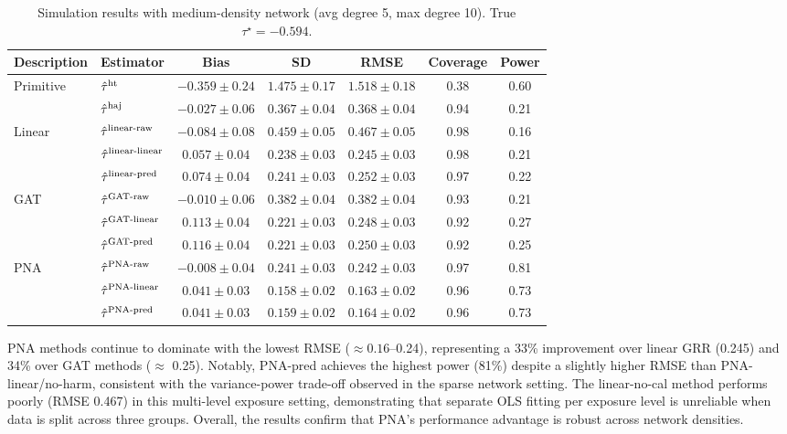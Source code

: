 \documentclass{article}
\theoremstyle{plain}
\theoremstyle{definition}
\theoremstyle{remark}
\newcommand{\hort}{\textup{ht}}
\newcommand{\haj}{\textup{haj}}
\begin{document}
\begin{table}[h]
    \centering
    \caption{Simulation results with medium-density network (avg degree 5, max degree 10). True $\tau^\star = -0.594$.}
    \small
    \begin{tabular}{ll|ccc|cc}
        \toprule
        Description & Estimator & Bias & SD & RMSE & Coverage & Power \\
        \midrule
        Primitive  & $\hat\tau^{\hort}$ & $-0.359 \pm 0.24$ & $1.475 \pm 0.17$ & $1.518 \pm 0.18$ & 0.38 & 0.60 \\
        & $\hat\tau^{\haj}$ & $-0.027 \pm 0.06$ & $0.367 \pm 0.04$ & $0.368 \pm 0.04$ & 0.94 & 0.21 \\
        \midrule
        Linear  
        & $\hat\tau^{\textup{linear-raw}}$ & $-0.084 \pm 0.08$ & $0.459 \pm 0.05$ & $0.467 \pm 0.05$ & 0.98 & 0.16 \\
        & $\hat\tau^{\textup{linear-linear}}$ & $0.057 \pm 0.04$ & $0.238 \pm 0.03$ & $0.245 \pm 0.03$ & 0.98 & 0.21 \\
        & $\hat\tau^{\textup{linear-pred}}$ & $0.074 \pm 0.04$ & $0.241 \pm 0.03$ & $0.252 \pm 0.03$ & 0.97 & 0.22 \\
        \midrule
        GAT
        & $\hat\tau^{\textup{GAT-raw}}$ & $-0.010 \pm 0.06$ & $0.382 \pm 0.04$ & $0.382 \pm 0.04$ & 0.93 & 0.21 \\
        & $\hat\tau^{\textup{GAT-linear}}$ & $0.113 \pm 0.04$ & $0.221 \pm 0.03$ & $0.248 \pm 0.03$ & 0.92 & 0.27 \\
        & $\hat\tau^{\textup{GAT-pred}}$ & $0.116 \pm 0.04$ & $0.221 \pm 0.03$ & $0.250 \pm 0.03$ & 0.92 & 0.25 \\
        \midrule
        PNA 
        & $\hat\tau^{\textup{PNA-raw}}$ & $\mathbf{-0.008 \pm 0.04}$ & $\mathbf{0.241 \pm 0.03}$ & $\mathbf{0.242 \pm 0.03}$ & 0.97 & 0.81 \\
        & $\hat\tau^{\textup{PNA-linear}}$ & $\mathbf{0.041 \pm 0.03}$ & $\mathbf{0.158 \pm 0.02}$ & $\mathbf{0.163 \pm 0.02}$ & 0.96 & 0.73 \\
        & $\hat\tau^{\textup{PNA-pred}}$ & $\mathbf{0.041 \pm 0.03}$ & $\mathbf{0.159 \pm 0.02}$ & $\mathbf{0.164 \pm 0.02}$ & 0.96 & 0.73 \\
        \bottomrule
    \end{tabular}
    \label{tab::simu_out2_results}
\end{table}

PNA methods continue to dominate with the lowest RMSE ($\approx 0.16$--0.24), representing a 33\% improvement over linear GRR (0.245) and 34\% over GAT methods ($\approx$ 0.25). Notably, PNA-pred achieves the highest power (81\%) despite a slightly higher RMSE than PNA-linear/no-harm, consistent with the variance-power trade-off observed in the sparse network setting. The linear-no-cal method performs poorly (RMSE 0.467) in this multi-level exposure setting, demonstrating that separate OLS fitting per exposure level is unreliable when data is split across three groups. Overall, the results confirm that PNA's performance advantage is robust across network densities.
\end{document}
